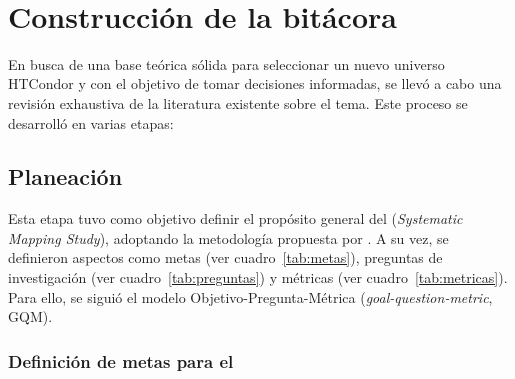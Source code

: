 \label{cap:revisionLiteratura}
\mbox{}\\
\section{Construcción de la bitácora}

En busca de una base teórica sólida para seleccionar un nuevo universo HTCondor y con el objetivo de tomar decisiones informadas, se llevó a cabo una revisión exhaustiva de la literatura existente sobre el tema. Este proceso se desarrolló en varias etapas:


\subsection{Planeación}

Esta etapa tuvo como objetivo definir el propósito general del \SMS (\textit{Systematic Mapping Study}), adoptando la metodología propuesta por \cite{Sepulveda2021}.
A su vez, se definieron aspectos como metas (ver cuadro~\ref{tab:metas}), preguntas de investigación (ver cuadro~\ref{tab:preguntas}) y métricas (ver cuadro~\ref{tab:metricas}). Para ello, se siguió el modelo
Objetivo-Pregunta-Métrica (\textit{goal-question-metric}, GQM).

\subsubsection{Definición de metas para el \SMS}

